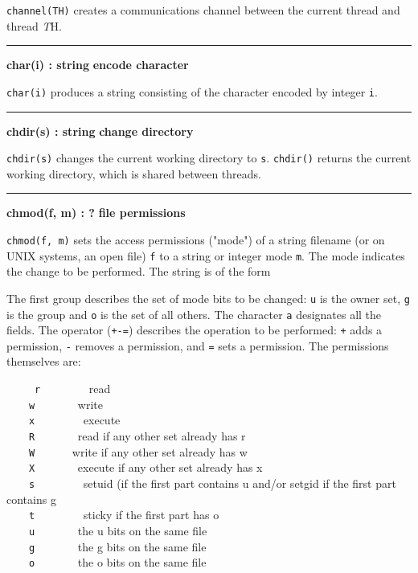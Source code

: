 \noindent
{}\texttt{channel(TH)} creates a communications channel
between the current thread and thread {\textit TH}.

\bigskip
\hrule\vspace{0.1cm}
\noindent
{\bf char(i) : string } \hfill {\bf encode character}

\noindent
{}\texttt{char(i)} produces a string consisting of the
character encoded by integer \texttt{i}.

\bigskip
\hrule\vspace{0.1cm}
\noindent
{\bf chdir(s) : string } \hfill {\bf change directory}\WarningNotThreadSafe

\noindent
{}\texttt{chdir(s)} changes the current
working directory to \texttt{s}. \texttt{chdir()} returns the current
working directory, which is shared between threads.


\bigskip
\hrule\vspace{0.1cm}
\noindent
{\bf chmod(f, m) : ? } \hfill {\bf file permissions}

\noindent
{}
\texttt{chmod(f, m)}
sets the access permissions ("mode") of
a string filename (or on UNIX systems, an open file) \texttt{f} to a
string or integer mode \texttt{m}. The mode indicates the change to be
performed. The string is of the form

\iconcode{
\>   [ugoa]*[+-=][rwxRWXstugo]* }%

The first group describes the set of mode bits to be changed: \texttt{u}
is the owner set, \texttt{g} is the group and \texttt{o} is the set of
all others. The character \texttt{a} designates all the fields. The
operator (\texttt{+-=}) describes the operation to be performed:
\texttt{+} adds a permission, \texttt{{}-} removes a permission, and
\texttt{=} sets a permission. The permissions themselves are: 

\ \ \ \ \ \texttt{r} \ \ \ \ \ \ \ \ read\\
 \ \ \ \ \texttt{w} \ \ \ \ \ \ \ write\\
 \ \ \ \ \texttt{x} \ \ \ \ \ \ \ \ execute\\
 \ \ \ \ \texttt{R} \ \ \ \ \ \ \ read if any other set already has
r\\
 \ \ \ \ \texttt{W} \ \ \ \ \ \ write if any other set already has
w\\
 \ \ \ \ \texttt{X} \ \ \ \ \ \ \ execute if any other set already has
x\\
 \ \ \ \ \texttt{s} \ \ \ \ \ \ \ \ setuid (if the first part contains u
and/or setgid if the first part contains g\\
 \ \ \ \ \texttt{t} \ \ \ \ \ \ \ \ sticky if the first part has
o\\
 \ \ \ \ \texttt{u} \ \ \ \ \ \ \ the u bits on the same file\\
 \ \ \ \ \texttt{g} \ \ \ \ \ \ \ the g bits on the same file\\
 \ \ \ \ \texttt{o} \ \ \ \ \ \ \ the o bits on the same file

